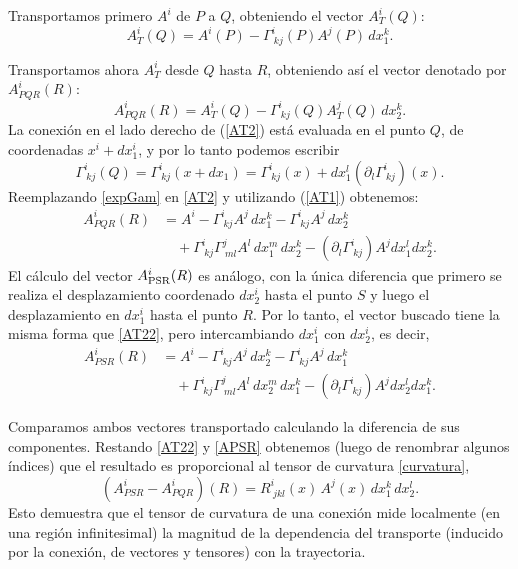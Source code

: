 Transportamos primero $A^i$ de $P$ a $Q$, obteniendo el vector $A_{T}^i(Q)$:
\begin{equation}
A_{T}^i(Q)=A^i(P) -\Gamma_{\ kj}^i(P)A^j(P)\, dx_1^k .
\label{AT1}%
\end{equation}

Transportamos ahora $A_{T}^i $ desde $Q$ hasta $R$, obteniendo así el vector denotado por $A_{PQR}^i (R)$:
\begin{equation}
A_{PQR}^i (R) = A_{T}^i (Q) -\Gamma_{\ kj}^i(Q)A_{T}^j (Q)\,dx_2^k. \label{AT2}%
\end{equation}
 La conexión en el lado derecho de (\ref{AT2}) está evaluada en el punto $Q$, de coordenadas $x^i +dx_1^i$, y por lo tanto podemos escribir
\begin{equation}
\Gamma_{\ kj}^i(Q)=\Gamma_{\ kj}^i (x+dx_1)=\Gamma_{\ kj}^i(x)+dx_1^l(\partial_l\Gamma_{\ kj}^i) (x) . \label{expGam}
\end{equation}
Reemplazando \eqref{expGam} en \eqref{AT2} y utilizando (\ref{AT1}) obtenemos:%
\begin{align}
A_{PQR}^i (R) &= A^i -\Gamma_{\ kj}^i A^j\,dx_1^k-\Gamma_{\ kj}^i A^j\,dx_2^k \nonumber\\
& \quad  +\Gamma_{\ kj}^i \Gamma_{\ ml}^jA^l\, dx_1^m\,dx_2^k -(\partial_l\Gamma_{\ kj}^i) A^j dx_1^l dx_2^k. \label{AT22}
\end{align}
El cálculo del vector $A_{\rm PSR}^i(R)$ es análogo, con la única diferencia que primero se realiza el desplazamiento coordenado $dx_2^i$ hasta el punto $S$ y luego el desplazamiento en $dx_1^i$ hasta el punto $R$. Por lo tanto, el vector buscado tiene la misma forma que \eqref{AT22}, pero intercambiando $dx_1^i$ con $dx_2^i$, es decir,
\begin{align}
A_{PSR}^i (R) &= A^i -\Gamma_{\ kj}^i A^j\,dx_2^k-\Gamma_{\ kj}^i A^j\,dx_1^k \nonumber\\
& \quad  +\Gamma_{\ kj}^i \Gamma_{\ ml}^jA^l\, dx_2^m\,dx_1^k -(\partial_l\Gamma_{\ kj}^i) A^j dx_2^l dx_1^k. \label{APSR}
\end{align}

Comparamos ambos vectores transportado calculando la diferencia de sus componentes. Restando \eqref{AT22} y \eqref{APSR} obtenemos (luego de renombrar algunos índices) que el resultado es proporcional al tensor de curvatura \eqref{curvatura},
\begin{equation}
\boxed{(A_{PSR}^i-A^i_{PQR})(R) =R_{\ jkl}^i(x)\, A^j(x)\,dx_1^k\,dx_2^l.} \label{19}%
\end{equation}
Esto demuestra que el tensor de curvatura de una conexión mide localmente (en una región infinitesimal) la magnitud de la dependencia del transporte (inducido por la conexión, de vectores y tensores) con la trayectoria.

